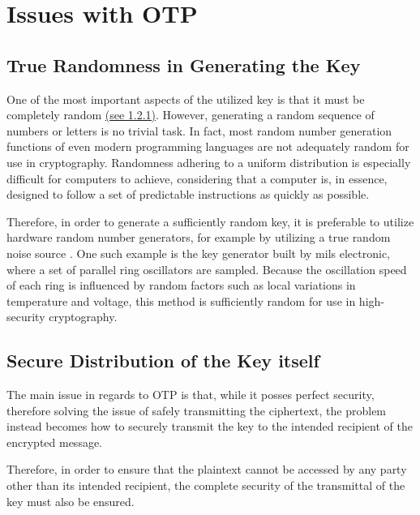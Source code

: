 \documentclass[12pt, a4paper]{report}
\theoremstyle{definition}
\theoremstyle{remark}
\begin{document}
\section{Issues with OTP}
\subsection{True Randomness in Generating the Key}
One of the most important aspects of the utilized key is that it must be completely random \hyperref[sec::otpkeygen]{(see 1.2.1)}. However, generating a random sequence of numbers or letters is no trivial task. In fact, most random number generation functions of even modern programming languages are not adequately random for use in cryptography. Randomness adhering to a uniform distribution is especially difficult for computers to achieve, considering that a computer is, in essence, designed to follow a set of predictable instructions as quickly as possible.

Therefore, in order to generate a sufficiently random key, it is preferable to utilize hardware random number generators, for example by utilizing a true random noise source \cite{MilsElectronic}. One such example is the key generator built by mils electronic, where a set of parallel ring oscillators are sampled. Because the oscillation speed of each ring is influenced by random factors such as local variations in temperature and voltage, this method is sufficiently random for use in high-security cryptography.


\subsection{Secure Distribution of the Key itself}
The main issue in regards to OTP is that, while it posses perfect security, therefore solving the issue of safely transmitting the ciphertext, the problem instead becomes how to securely transmit the key to the intended recipient of the encrypted message.

Therefore, in order to ensure that the plaintext cannot be accessed by any party other than its intended recipient, the complete security of the transmittal of the key must also be ensured.
\end{document}
